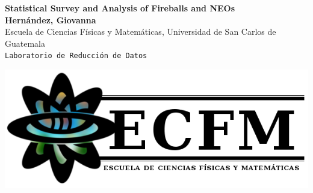\documentclass[a1,portrait]{a1poster}
\begin{document}
% 

\begin{minipage}[b]{0.6\linewidth}
\Huge \color{DarkOliveGreen} \textbf{Statistical Survey and Analysis of Fireballs and NEOs} \color{Black}\\ %
\large \textbf{Hernández, Giovanna}\\[0.5cm] %
\large Escuela de Ciencias Físicas y Matemáticas, Universidad de San Carlos de Guatemala\\[0.2cm] %
\texttt{Laboratorio de Reducción de Datos}\\
\end{minipage}
%
\begin{minipage}[b]{0.4\linewidth}
\includegraphics[width=15cm]{ecfmLogoColorO.png}\\
\end{minipage}

\vspace{.5cm} %

\end{document}
